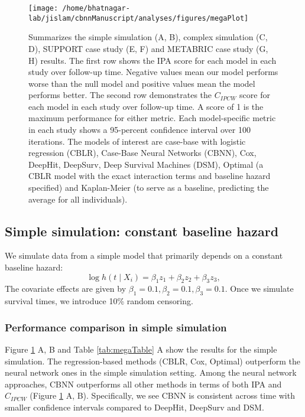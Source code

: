 \documentclass[AMA,STIX1COL,]{WileyNJD-v2}
\begin{document}
\begin{figure}

{\centering \texttt{[image: /home/bhatnagar-lab/jislam/cbnnManuscript/analyses/figures/megaPlot]} 

}

\caption{Summarizes the simple simulation (A, B), complex simulation (C, D), SUPPORT case study (E, F) and METABRIC case study (G, H) results. The first row shows the IPA score for each model in each study over follow-up time. Negative values mean our model performs worse than the null model and positive values mean the model performs better. The second row demonstrates the $C_{IPCW}$ score for each model in each study over follow-up time. A score of 1 is the maximum performance for either metric. Each model-specific metric in each study shows a 95-percent confidence interval over 100 iterations. The models of interest are case-base with logistic regression (CBLR), Case-Base Neural Networks (CBNN), Cox, DeepHit, DeepSurv, Deep Survival Machines (DSM), Optimal (a CBLR model with the exact interaction terms and baseline hazard specified) and Kaplan-Meier (to serve as a baseline, predicting the average for all individuals).}\label{fig:megaPlot}
\end{figure}

\hypertarget{simple-simulation-constant-baseline-hazard}{%
\subsection{Simple simulation: constant baseline
hazard}\label{simple-simulation-constant-baseline-hazard}}

We simulate data from a simple model that primarily depends on a
constant baseline hazard:
\[\log h(t \mid X_i) = \beta_{{1}}z_{1}+\beta_{{2}}z_{2}+\beta_{{3}}z_{3},\]
The covariate effects are given by
\(\beta_{{1}}=0.1, \beta_{{2}}=0.1, \beta_{{3}}=0.1\). Once we simulate
survival times, we introduce 10\% random censoring.

\hypertarget{performance-comparison-in-simple-simulation}{%
\subsubsection{Performance comparison in simple
simulation}\label{performance-comparison-in-simple-simulation}}

Figure \ref{fig:megaPlot} A, B and Table \ref{tab:megaTable} A show the
results for the simple simulation. The regression-based methods (CBLR,
Cox, Optimal) outperform the neural network ones in the simple
simulation setting. Among the neural network approaches, CBNN
outperforms all other methods in terms of both IPA and \(C_{IPCW}\)
(Figure \ref{fig:megaPlot} A, B). Specifically, we see CBNN is
consistent across time with smaller confidence intervals compared to
DeepHit, DeepSurv and DSM.
\end{document}
